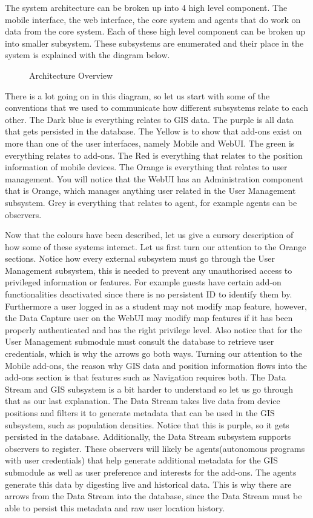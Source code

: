 The system architecture can be broken up into 4 high level component. The mobile interface, the web interface, the core system and agents that do work on data from the core system. Each of these high level component can be broken up into smaller subsystem. These subsystems are enumerated and their place in the system is explained with the diagram below.

\begin{figure}[h]
\caption{Architecture Overview}
\end{figure}
There is a lot going on in this diagram, so let us start with some of the conventions that we used to communicate how different subsystems relate to each other. The Dark blue is everything relates to GIS data. The purple is all data that gets persisted in the database. The Yellow is to show that add-ons exist on more than one of the user interfaces, namely Mobile and WebUI. The green is everything relates to add-ons. The Red is everything that relates to the position information of mobile devices. The Orange is everything that relates to user management. You will notice that the WebUI has an Administration component that is Orange, which manages anything user related in the User Management subsystem. Grey is everything that relates to agent, for example agents can be observers.\par
\bigskip
Now that the colours have been described, let us give a cursory description of how some of these systems interact. Let us first turn our attention to the Orange sections. Notice how every external subsystem must go through the User Management subsystem, this is needed to prevent any unauthorised access to privileged information or features. For example guests have certain add-on functionalities deactivated since there is no persistent ID to identify them by. Furthermore a user logged in as a student may not modify map feature, however, the Data Capture user on the WebUI may modify map features if it has been properly authenticated and has the right privilege level. Also notice that for the User Management submodule must consult the database to retrieve user credentials, which is why the arrows go both ways. Turning our attention to the Mobile add-ons, the reason why GIS data and position information flows into the add-ons section is that features such as Navigation requires both. The Data Stream and GIS subsystem is a bit harder to understand so let us go through that as our last explanation. The Data Stream takes live data from device positions and filters it to generate metadata that can be used in the GIS subsystem, such as population densities. Notice that this is purple, so it gets persisted in the database. Additionally, the Data Stream subsystem supports observers to register. These observers will likely be agents(autonomous programs with user credentials) that help generate additional metadata for the GIS submodule as well as user preference and interests for the add-ons. The agents generate this data by digesting live and historical data. This is why there are arrows from the Data Stream into the database, since the Data Stream must be able to persist this metadata and raw user location history.
